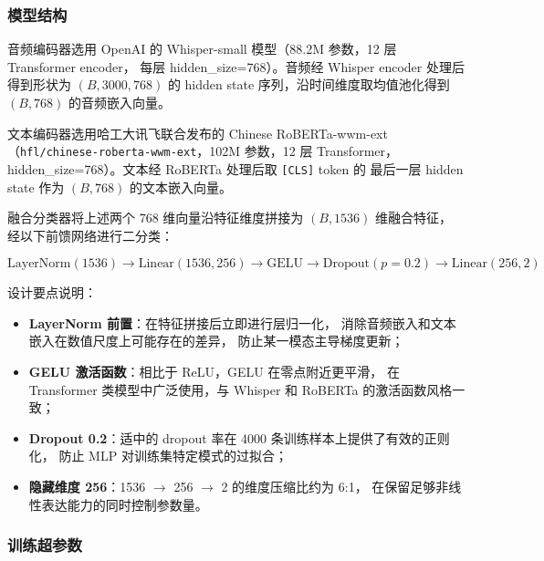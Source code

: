 \documentclass[11pt,a4paper]{ctexart}
\begin{document}
\subsubsection{模型结构}

音频编码器选用 OpenAI 的 Whisper-small 模型（88.2M 参数，12 层 Transformer encoder，
每层 hidden\_size=768）。音频经 Whisper encoder 处理后得到形状为
$(B, 3000, 768)$ 的 hidden state 序列，沿时间维度取均值池化得到 $(B, 768)$ 的音频嵌入向量。

文本编码器选用哈工大讯飞联合发布的 Chinese RoBERTa-wwm-ext
（\texttt{hfl/chinese-roberta-wwm-ext}，102M 参数，12 层 Transformer，
hidden\_size=768）。文本经 RoBERTa 处理后取 \texttt{[CLS]} token 的
最后一层 hidden state 作为 $(B, 768)$ 的文本嵌入向量。

融合分类器将上述两个 768 维向量沿特征维度拼接为 $(B, 1536)$ 维融合特征，
经以下前馈网络进行二分类：

\[
\text{LayerNorm}(1536) \rightarrow \text{Linear}(1536, 256) \rightarrow \text{GELU}
\rightarrow \text{Dropout}(p=0.2) \rightarrow \text{Linear}(256, 2)
\]

设计要点说明：
\begin{itemize}
  \item \textbf{LayerNorm 前置}：在特征拼接后立即进行层归一化，
  消除音频嵌入和文本嵌入在数值尺度上可能存在的差异，
  防止某一模态主导梯度更新；
  \item \textbf{GELU 激活函数}：相比于 ReLU，GELU 在零点附近更平滑，
  在 Transformer 类模型中广泛使用，与 Whisper 和 RoBERTa 的激活函数风格一致；
  \item \textbf{Dropout 0.2}：适中的 dropout 率在 4000 条训练样本上提供了有效的正则化，
  防止 MLP 对训练集特定模式的过拟合；
  \item \textbf{隐藏维度 256}：1536 $\rightarrow$ 256 $\rightarrow$ 2 的维度压缩比约为 6:1，
  在保留足够非线性表达能力的同时控制参数量。
\end{itemize}

\subsubsection{训练超参数}
\end{document}
